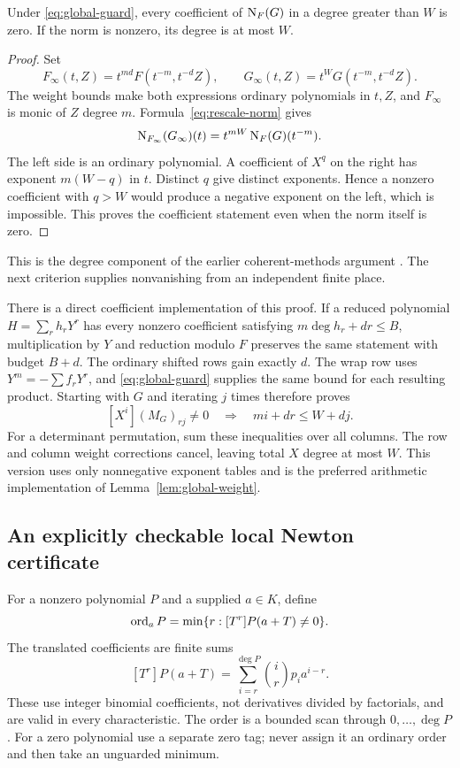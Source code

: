 \begin{lemma}\label{lem:global-weight}
Under \eqref{eq:global-guard}, every coefficient of $\operatorname{N}_F(G)$ in a degree greater than $W$ is zero. If the norm is nonzero, its degree is at most $W$.
\end{lemma}
\begin{proof}
Set
\[
 F_\infty(t,Z)=t^{md}F(t^{-m},t^{-d}Z),\qquad
 G_\infty(t,Z)=t^WG(t^{-m},t^{-d}Z).
\]
The weight bounds make both expressions ordinary polynomials in $t,Z$, and $F_\infty$ is monic of $Z$ degree $m$. Formula~\eqref{eq:rescale-norm} gives
\begin{equation}\label{eq:infty-identity}
 \operatorname{N}_{F_\infty}(G_\infty)(t)
       =t^{mW}\operatorname{N}_F(G)(t^{-m}).
\end{equation}
The left side is an ordinary polynomial. A coefficient of $X^q$ on the right has exponent $m(W-q)$ in $t$. Distinct $q$ give distinct exponents. Hence a nonzero coefficient with $q>W$ would produce a negative exponent on the left, which is impossible. This proves the coefficient statement even when the norm itself is zero.
\end{proof}

This is the degree component of the earlier coherent-methods argument \cite{repo-coherent}. The next criterion supplies nonvanishing from an independent finite place.

There is a direct coefficient implementation of this proof. If a reduced polynomial $H=\sum_r h_rY^r$ has every nonzero coefficient satisfying $m\deg h_r+dr\le B$, multiplication by $Y$ and reduction modulo $F$ preserves the same statement with budget $B+d$. The ordinary shifted rows gain exactly $d$. The wrap row uses $Y^m=-\sum f_rY^r$, and \eqref{eq:global-guard} supplies the same bound for each resulting product. Starting with $G$ and iterating $j$ times therefore proves
\[
 [X^i](M_G)_{rj}\ne0\quad\Longrightarrow\quad mi+dr\le W+dj.
\]
For a determinant permutation, sum these inequalities over all columns. The row and column weight corrections cancel, leaving total $X$ degree at most $W$. This version uses only nonnegative exponent tables and is the preferred arithmetic implementation of Lemma~\ref{lem:global-weight}.

\subsection{An explicitly checkable local Newton certificate}

For a nonzero polynomial $P$ and a supplied $a\in K$, define
\[
 \operatorname{ord}_aP=\min\{r:[T^r]P(a+T)\ne0\}.
\]
The translated coefficients are finite sums
\[
 [T^r]P(a+T)=\sum_{i=r}^{\deg P}\binom{i}{r}p_i a^{i-r}.
\]
These use integer binomial coefficients, not derivatives divided by factorials, and are valid in every characteristic. The order is a bounded scan through $0,\ldots,\deg P$. For a zero polynomial use a separate zero tag; never assign it an ordinary order and then take an unguarded minimum.


